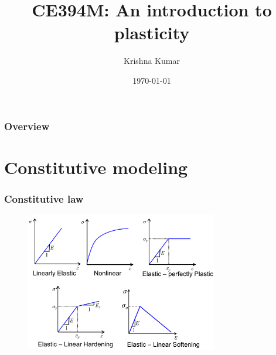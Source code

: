 \documentclass[notes]{beamer}
\title[CE394M: intro to plasticity]{CE394M: An introduction to plasticity}
\author{Krishna Kumar} %
\institute[UT Austin] %
{
University of Texas at Austin \\
\medskip
\textit{
  \url{krishnak@utexas.edu}} %
}
\date{\today} %
\begin{document}
\begin{frame}
\titlepage %
\end{frame}

\begin{frame}
 \frametitle{Overview}
 \tableofcontents
\end{frame}

\section{Constitutive modeling}
\begin{frame}
\frametitle{Constitutive law}
\begin{figure}
	\includegraphics[width=0.75\textwidth]{figs/constitutive-law.png}
\end{figure}
\end{frame}
\end{document}
